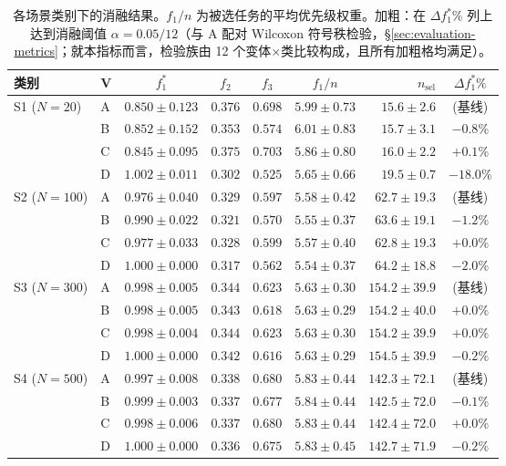 \begin{table}[H]
\centering
\small
\setlength{\tabcolsep}{2.5pt}
\caption{各场景类别下的消融结果。$f_1/n$ 为被选任务的平均优先级权重。加粗：在 $\Delta f_1^*\%$ 列上达到消融阈值 $\alpha=0.05/12$（与 A 配对 Wilcoxon 符号秩检验，\S\ref{sec:evaluation-metrics}；就本指标而言，检验族由 12 个变体$\times$类比较构成，且所有加粗格均满足）。}
\label{tab:ablation}
\begin{tabular}{llccccrc}
\toprule
\textbf{类别} & \textbf{V} & \textbf{$f_1^*$} & \textbf{$f_2$} &
\textbf{$f_3$} & \textbf{$f_1/n$} & \textbf{$n_\text{sel}$} &
\textbf{$\Delta f_1^*\%$} \\
\midrule
\multirow{4}{*}{S1 ($N=20$)}
 & A & $0.850 \pm 0.123$ & $0.376$ & $0.698$ & $5.99 \pm 0.73$ &
   $15.6 \pm 2.6$ & (基线) \\
 & B & $0.852 \pm 0.152$ & $0.353$ & $0.574$ & $6.01 \pm 0.83$ &
   $15.7 \pm 3.1$ & $-0.8\%$ \\
 & C & $0.845 \pm 0.095$ & $0.375$ & $0.703$ & $5.86 \pm 0.80$ &
   $16.0 \pm 2.2$ & $+0.1\%$ \\
 & D & $1.002 \pm 0.011$ & $0.302$ & $0.525$ & $5.65 \pm 0.66$ &
   $19.5 \pm 0.7$ & $\mathbf{-18.0\%}$ \\
\midrule
\multirow{4}{*}{S2 ($N=100$)}
 & A & $0.976 \pm 0.040$ & $0.329$ & $0.597$ & $5.58 \pm 0.42$ &
   $62.7 \pm 19.3$ & (基线) \\
 & B & $0.990 \pm 0.022$ & $0.321$ & $0.570$ & $5.55 \pm 0.37$ &
   $63.6 \pm 19.1$ & $\mathbf{-1.2\%}$ \\
 & C & $0.977 \pm 0.033$ & $0.328$ & $0.599$ & $5.57 \pm 0.40$ &
   $62.8 \pm 19.3$ & $+0.0\%$ \\
 & D & $1.000 \pm 0.000$ & $0.317$ & $0.562$ & $5.54 \pm 0.37$ &
   $64.2 \pm 18.8$ & $\mathbf{-2.0\%}$ \\
\midrule
\multirow{4}{*}{S3 ($N=300$)}
 & A & $0.998 \pm 0.005$ & $0.344$ & $0.623$ & $5.63 \pm 0.30$ &
   $154.2 \pm 39.9$ & (基线) \\
 & B & $0.998 \pm 0.005$ & $0.343$ & $0.618$ & $5.63 \pm 0.29$ &
   $154.2 \pm 40.0$ & $+0.0\%$ \\
 & C & $0.998 \pm 0.004$ & $0.344$ & $0.623$ & $5.63 \pm 0.30$ &
   $154.2 \pm 39.9$ & $+0.0\%$ \\
 & D & $1.000 \pm 0.000$ & $0.342$ & $0.616$ & $5.63 \pm 0.29$ &
   $154.5 \pm 39.9$ & $\mathbf{-0.2\%}$ \\
\midrule
\multirow{4}{*}{S4 ($N=500$)}
 & A & $0.997 \pm 0.008$ & $0.338$ & $0.680$ & $5.83 \pm 0.44$ &
   $142.3 \pm 72.1$ & (基线) \\
 & B & $0.999 \pm 0.003$ & $0.337$ & $0.677$ & $5.84 \pm 0.44$ &
   $142.5 \pm 72.0$ & $-0.1\%$ \\
 & C & $0.998 \pm 0.006$ & $0.337$ & $0.680$ & $5.83 \pm 0.44$ &
   $142.4 \pm 72.0$ & $+0.0\%$ \\
 & D & $1.000 \pm 0.000$ & $0.336$ & $0.675$ & $5.83 \pm 0.45$ &
   $142.7 \pm 71.9$ & $\mathbf{-0.2\%}$ \\
\bottomrule
\end{tabular}
\end{table}

